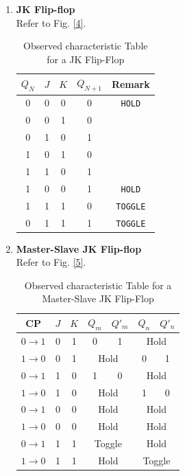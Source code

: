 \begin{enumerate}
    \item \textbf{JK Flip-flop}\\
    Refer to Fig. \ref{4}.
    \begin{table}[H]
        \centering
        \begin{tabular}{|c|c|c|c|c|}\hline
            $Q_N$ & $J$ & $K$ & $Q_{N+1}$ & Remark \\ \hline
            0 & 0 & 0 & 0 & \verb|HOLD| \\ 
            0 & 0 & 1 & 0 & \\ 
            0 & 1 & 0 & 1 & \\ 
            1 & 0 & 1 & 0 & \\ 
            1 & 1 & 0 & 1 & \\
            1 & 0 & 0 & 1 & \verb|HOLD|\\ 
            1 & 1 & 1 & 0 & \verb|TOGGLE| \\ 
            0 & 1 & 1 & 1 & \verb|TOGGLE| \\ \hline
        \end{tabular}
        \caption{Observed characteristic Table for a JK Flip-Flop}
    \end{table}

    \item \textbf{Master-Slave JK Flip-flop}\\
    Refer to Fig. \ref{5}.
    \begin{table}[H]
        \centering
        \begin{tabular}{|c|c|c|c|c|c|c|}\hline
            CP &$J$ & $K$ & $Q_m$ & $ Q'_m$ & $Q_n$ & $ Q'_n$ \\ \hline
            $0 \rightarrow 1$ & 0 & 1 & 0 & 1 & \multicolumn{2}{c|}{Hold} \\ \hline
            $1 \rightarrow 0$ & 0 & 1 & \multicolumn{2}{c|}{Hold} & 0 & 1 \\ \hline
            $0 \rightarrow 1$ & 1 & 0 & 1 & 0 & \multicolumn{2}{c|}{Hold}\\ \hline
            $1 \rightarrow 0$ & 1 & 0 & \multicolumn{2}{c|}{Hold} & 1 & 0\\ \hline
            $0 \rightarrow 1$ & 0 & 0 & \multicolumn{2}{c|}{Hold} & \multicolumn{2}{c|}{Hold} \\ \hline
            $1 \rightarrow 0$ & 0 & 0 & \multicolumn{2}{c|}{Hold} & \multicolumn{2}{c|}{Hold} \\ \hline
            $0 \rightarrow 1$ & 1 & 1 & \multicolumn{2}{c|}{Toggle} & \multicolumn{2}{c|}{Hold} \\\hline
            $1 \rightarrow 0$ & 1 & 1 & \multicolumn{2}{c|}{Hold} & \multicolumn{2}{c|}{Toggle} \\ \hline
        \end{tabular}
        \caption{Observed characteristic Table for a Master-Slave JK Flip-Flop}
    \end{table}


\end{enumerate}
